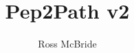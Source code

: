 \documentclass{l4proj}
\begin{document}
\title{Pep2Path v2}
\author{Ross McBride}
\date{}

\maketitle

\begin{abstract}
\end{abstract}


%
%
%
\educationalconsent


\tableofcontents

%
%
%
%
%
%
%
\end{document}
